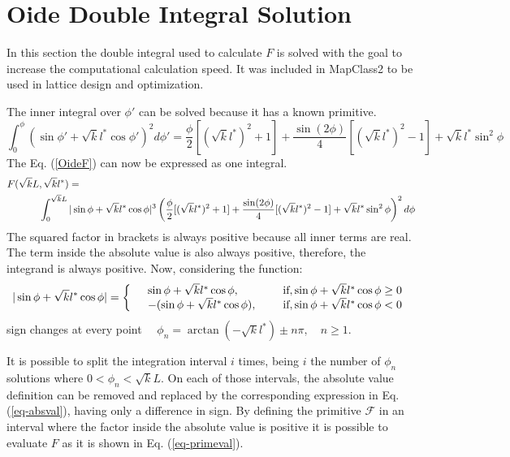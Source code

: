 \section{Oide Double Integral Solution}\label{s:DoubleIntegral}
In this section the double integral used to calculate $F$ is solved with the goal to increase the computational calculation speed. It was included in MapClass2\cite{Mapclassorig,Mapclass,Mapclass2,githubMapClass2} to be used in lattice design and optimization.\par
  The inner integral over $\phi'$ can be solved because it has a known primitive.
\begin{equation}
 \int_0^\phi (\sin \phi'+ \sqrt{k}l^*\cos\phi')^2d\phi'=\frac{\phi}{2}[(\sqrt{k}l^*)^2 +1 ] + \frac{\sin(2\phi)}{4}[(\sqrt{k}l^*)^2 -1]+\sqrt{k}l^*\sin^2\phi
\end{equation}
The Eq. (\ref{OideF}) can now be expressed as one integral.
{\scriptsize
\begin{align}
F(\sqrt{k}L&,\sqrt{k}l^*) =\\
&\int_0^{ \sqrt{k}L} |\sin\phi+\sqrt{k}l^*\cos\phi|^3 \left( \frac{\phi}{2}[(\sqrt{k}l^*)^2 +1 ] + \frac{\sin(2\phi)}{4}[(\sqrt{k}l^*)^2 -1]+\sqrt{k}l^*\sin^2\phi\right)^2 d\phi\notag
\end{align}
}
The squared factor in brackets is always positive because all inner terms are real. The term inside the absolute value is also always positive, therefore, the integrand is always positive. Now, considering the function:
  \begin{equation}
  |\sin \phi + \sqrt{k}l^*\cos\phi|=\left\{
  \begin{array}{c l l}
&  \sin\phi+\sqrt{k}l^*\cos	\phi,\quad\qquad&\text{if}, \sin\phi+	\sqrt{k}l^*\cos	\phi\geq0\\
&  -(\sin\phi+\sqrt{k}l^*\cos\phi),\quad&\text{if}, \sin\phi+	\sqrt{k}l^*\cos	\phi<0
  \end{array}\right.\label{eq-absval}
 \end{equation}
sign changes at every point $\quad\phi_n = \arctan(-\sqrt{ k}l^*)\pm n\pi,\quad n\geq1$.\par
It is possible to split the integration interval $i$ times, being $i$ the number of $\phi_n$ solutions where $0<\phi_n<\sqrt{k}L$. On each of those intervals, the absolute value definition can be removed and replaced by the corresponding expression in Eq. (\ref{eq-absval}), having only a difference in sign. By defining the primitive $\mathscr{F}$ in an interval where the factor inside the absolute value is positive it is possible to evaluate $F$ as it is shown in Eq. (\ref{eq-primeval}).

